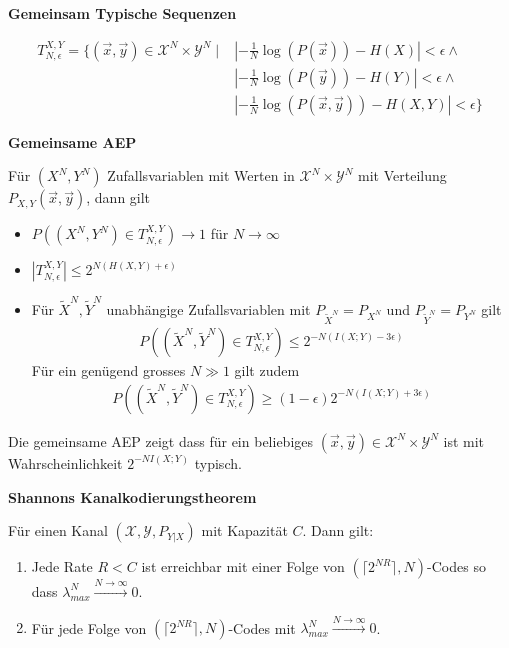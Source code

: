 \documentclass[25pt]{sciposter}
\newenvironment{defn}[1]{\begin{mdframed}[backgroundcolor=blue!10,innertopmargin=15pt, nobreak=true,innerbottommargin=15pt]
		\textbf{#1 }
	}
	{ 
	\end{mdframed}
}
\newenvironment{thm}[1]{\begin{mdframed}[nobreak=true,backgroundcolor=Emerald!10,innertopmargin=15pt, innerbottommargin=15pt]
		\textbf{#1 }
	}
	{ 
	\end{mdframed}
}
\begin{document}
\begin{multicols}{3}
\begin{defn}{Gemeinsam Typische Sequenzen}
	\begin{align*}
		T_{N,\epsilon}^{X,Y} = \{(\vec{x}, \vec{y}) \in \mathcal{X}^N \times \mathcal{Y}^N \mid &\left|-\frac{1}{N}\log(P(\vec{x})) - H(X)\right| < \epsilon \land \\
		&\left|-\frac{1}{N}\log(P(\vec{y})) - H(Y)\right| < \epsilon \land\\
		&\left|-\frac{1}{N}\log(P(\vec{x},\vec{y})) - H(X,Y)\right| < \epsilon\}
	\end{align*}
\end{defn}



\begin{thm}{Gemeinsame AEP}
	Für $(X^N, Y^N)$ Zufallsvariablen mit Werten in $\mathcal{X}^N \times \mathcal{Y}^N$ mit Verteilung $P_{X,Y}(\vec{x},\vec{y})$, dann gilt
	\begin{itemize}
		\item $P((X^N, Y^N) \in T_{N,\epsilon}^{X,Y}) \to 1$ für $N \to \infty$
		\item $|T_{N,\epsilon}^{X,Y}| \leq 2^{N(H(X,Y) + \epsilon)}$
		\item Für $\tilde{X}^N, \tilde{Y}^N$ unabhängige Zufallsvariablen mit $P_{\tilde{X}^N} = P_{X^N}$ und  $P_{\tilde{Y}^N} = P_{Y^N}$ gilt
		\begin{align*}
P((\tilde{X}^N, \tilde{Y}^N) \in T_{N,\epsilon}^{X,Y}) \leq 2^{-N(I(X;Y)-3\epsilon)}
		\end{align*}
		Für ein genügend grosses $N\gg 1$ gilt zudem
		\begin{align*}
					P((\tilde{X}^N, \tilde{Y}^N) \in T_{N,\epsilon}^{X,Y}) \geq (1-\epsilon) 2^{-N(I(X;Y) + 3 \epsilon)}
		\end{align*} 
	\end{itemize}
\end{thm}

Die gemeinsame AEP zeigt dass für ein beliebiges $(\vec{x}, \vec{y})\in \mathcal{X}^N\times \mathcal{Y}^N$ ist mit Wahrscheinlichkeit $2^{-NI(X;Y)}$ typisch.


\begin{thm}{Shannons Kanalkodierungstheorem}
	Für einen Kanal $(\mathcal{X},\mathcal{Y},P_{Y|X})$ mit Kapazität $C$.  Dann gilt:\begin{enumerate}
		\item Jede Rate $R < C$ ist erreichbar mit einer Folge von $(\lceil2^{NR}\rceil,N)$-Codes so dass $\lambda_{max}^{N} \stackrel{N\to \infty}{\longrightarrow} 0$.
		\item Für jede Folge von $(\lceil2^{NR}\rceil,N)$-Codes mit $\lambda_{max}^{N} \stackrel{N\to \infty}{\longrightarrow} 0$.
	\end{enumerate}
\end{thm}


\end{multicols}
\end{document}
